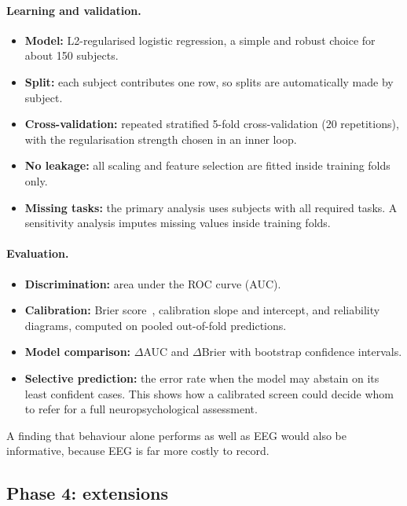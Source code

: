 \documentclass[11pt,a4paper]{article}
\begin{document}
\paragraph{Learning and validation.}
\begin{itemize}
  \item \textbf{Model:} L2-regularised logistic regression, a simple and robust choice for about 150 subjects.
  \item \textbf{Split:} each subject contributes one row, so splits are automatically made by subject.
  \item \textbf{Cross-validation:} repeated stratified 5-fold cross-validation (20 repetitions), with the regularisation strength chosen in an inner loop.
  \item \textbf{No leakage:} all scaling and feature selection are fitted inside training folds only.
  \item \textbf{Missing tasks:} the primary analysis uses subjects with all required tasks. A sensitivity analysis imputes missing values inside training folds.
\end{itemize}

\paragraph{Evaluation.}
\begin{itemize}
  \item \textbf{Discrimination:} area under the ROC curve (AUC).
  \item \textbf{Calibration:} Brier score~\cite{brier1950}, calibration slope and intercept, and reliability diagrams, computed on pooled out-of-fold predictions.
  \item \textbf{Model comparison:} $\Delta$AUC and $\Delta$Brier with bootstrap confidence intervals.
  \item \textbf{Selective prediction:} the error rate when the model may abstain on its least confident cases. This shows how a calibrated screen could decide whom to refer for a full neuropsychological assessment.
\end{itemize}

\noindent A finding that behaviour alone performs as well as EEG would also be informative, because EEG is far more costly to record.

\subsection{Phase 4: extensions}
\end{document}
